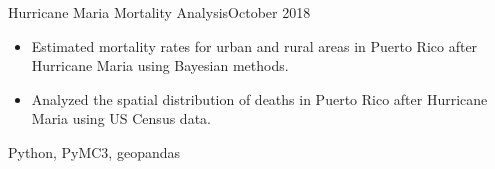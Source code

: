 \begin{projects}
    \project
    {\newline Hurricane Maria Mortality Analysis}{October 2018}
    {}
    {\begin{itemize}
    \item Estimated mortality rates for urban and rural areas in Puerto Rico after Hurricane Maria using Bayesian methods.
    \item Analyzed the spatial distribution of deaths in Puerto Rico after Hurricane Maria using US Census data.
    \end{itemize}}
    {Python, PyMC3, geopandas}

\end{projects}